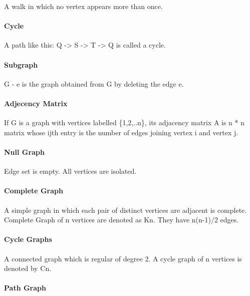 A walk in which no vertex appears more than once.

\hypertarget{cycle}{%
\paragraph{Cycle}\label{cycle}}

A path like this: Q -\textgreater{} S -\textgreater{} T -\textgreater{}
Q is called a cycle.

\hypertarget{subgraph}{%
\paragraph{Subgraph}\label{subgraph}}

G - e is the graph obtained from G by deleting the edge e.

\hypertarget{adjecency-matrix}{%
\paragraph{Adjecency Matrix}\label{adjecency-matrix}}

If G is a graph with vertices labelled \{1,2,..n\}, its adjacency matrix
A is n * n matrix whose ijth entry is the number of edges joining vertex
i and vertex j.

\hypertarget{null-graph}{%
\paragraph{Null Graph}\label{null-graph}}

Edge set is empty. All vertices are isolated.

\hypertarget{complete-graph}{%
\paragraph{Complete Graph}\label{complete-graph}}

A simple graph in which each pair of distinct vertices are adjacent is
complete. Complete Graph of n vertices are denoted as Kn. They have
n(n-1)/2 edges.

\hypertarget{cycle-graphs}{%
\paragraph{Cycle Graphs}\label{cycle-graphs}}

A connected graph which is regular of degree 2. A cycle graph of n
vertices is denoted by Cn.

\hypertarget{path-graph}{%
\paragraph{Path Graph}\label{path-graph}}

